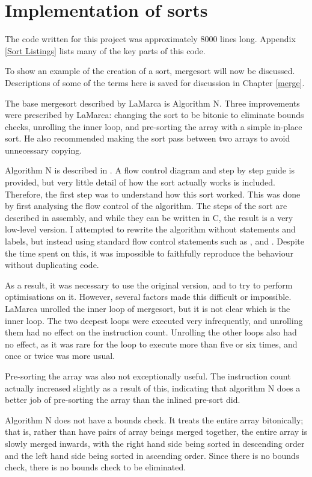 \section{Implementation of sorts}

The  code written for this project was approximately 8000 lines long.
Appendix \ref{Sort Listings} lists many of the key parts of this code.

To show an example of the creation of a sort, mergesort will now be discussed.
Descriptions of some of the terms here is saved for discussion in Chapter
\ref{merge}.

The base mergesort described by LaMarca is Algorithm N. Three improvements
were prescribed by LaMarca: changing the sort to be bitonic to eliminate bounds
checks, unrolling the inner loop, and pre-sorting the array with a simple in-place
sort. He also recommended making the sort pass between two arrays to avoid
unnecessary copying.

Algorithm N is described in \cite{Knuth98}. A flow control diagram and step by
step guide is provided, but very little detail of how the sort actually works is
included. Therefore, the first step was to understand how this sort worked. This
was done by first analysing the flow control of the algorithm. The steps of the
sort are described in assembly, and while they can be written in C, the result
is a very low-level version. I attempted to rewrite the algorithm without
 statements and labels, but instead using standard flow control
statements such as ,  and . Despite the time spent
on this, it was impossible to faithfully reproduce the behaviour without
duplicating code.

As a result, it was necessary to use the original version, and to try to perform
optimisations on it. However, several factors made this difficult or impossible.
LaMarca unrolled the inner loop of mergesort, but it is not clear which is the
inner loop. The two deepest loops were executed very infrequently, and
unrolling them had no effect on the instruction count. Unrolling the other loops
also had no effect, as it was rare for the loop to execute more than five or six
times, and once or twice was more usual.

Pre-sorting the array was also not exceptionally useful. The instruction count
actually increased slightly as a result of this, indicating that algorithm N
does a better job of pre-sorting the array than the inlined pre-sort did.

Algorithm N does not have a bounds check. It treats the entire array
bitonically; that is, rather than have pairs of array beings merged together,
the entire array is slowly merged inwards, with the right hand side being sorted
in descending order and the left hand side being sorted in ascending order.
Since there is no bounds check, there is no bounds check to be eliminated.

